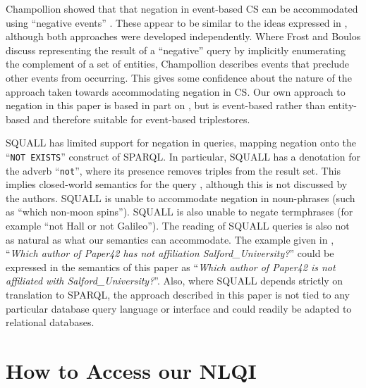\documentclass[../main.tex]{subfiles}
\begin{document}
\begin{refsection}
Champollion showed that that negation in event-based CS can be accommodated using ``negative events'' \cite{champollion2011}.  These appear to be similar to the ideas expressed in \cite{frostboulos2002}, although both approaches were developed independently.
Where Frost and Boulos discuss representing the result of a ``negative'' query by implicitly enumerating the complement of a set of entities, Champollion describes events that preclude other events from occurring.  This gives some confidence about the nature of the approach taken towards accommodating negation in CS. Our own approach to negation in this paper is based in part on \cite{frostboulos2002}, but is event-based rather than entity-based and therefore suitable for event-based triplestores.


SQUALL \cite{ferre:squall} has limited support for negation in queries, mapping negation onto the ``\texttt{NOT EXISTS}'' construct of SPARQL.  In particular, SQUALL has a denotation for the adverb ``\texttt{not}'', where its presence removes triples from the result set.  This implies closed-world semantics for the query \cite{dazari2014bridging}, although this is not discussed by the authors.  SQUALL is unable to accommodate negation in noun-phrases (such as ``which non-moon spins'').  SQUALL is also unable to negate termphrases (for example ``not Hall or not Galileo'').  The reading of SQUALL queries is also not as natural as what our semantics can accommodate.  The example given in \cite{ferre2014squall}, ``\textit{Which author of Paper42 has not affiliation Salford\_University?}'' could be expressed in the semantics of this paper as ``\textit{Which author of Paper42 is not affiliated with Salford\_University?}''.  Also, where SQUALL depends strictly on translation to SPARQL, the approach described in this paper is not tied to any particular database query language or interface and could readily be adapted to relational databases.


\section{How to Access our NLQI}
\label{sec:demo}


\end{refsection}
\end{document}
